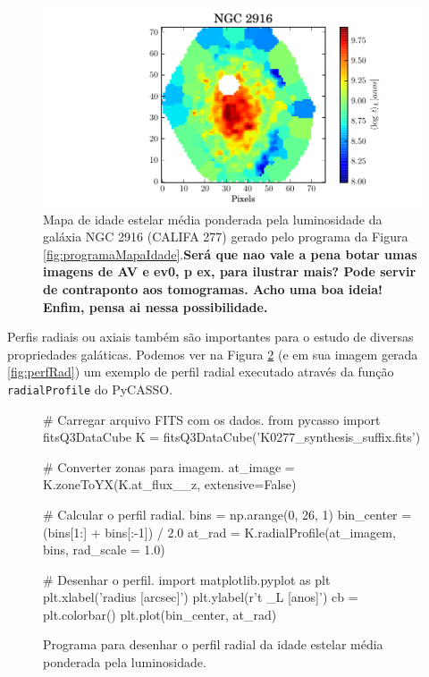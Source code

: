 \begin{figure}
	\includegraphics{figuras/at_flux_zone.pdf}
	\caption[Mapa da idade estelar média da galáxia NGC 2916] 
	{Mapa de idade estelar média ponderada pela luminosidade da galáxia NGC 2916
	(CALIFA 277) gerado pelo programa da Figura \ref{fig:programaMapaIdade}.{\bf\ojo Será que nao vale a pena botar umas
	imagens de AV e ev0, p ex, para ilustrar mais? Pode servir de contraponto aos tomogramas. Acho uma boa ideia! Enfim,
	pensa ai nessa possibilidade.} }
	\label{fig:mapaIdade}
\end{figure}

Perfis radiais ou axiais também são importantes para o estudo de diversas propriedades galáticas. Podemos ver na Figura
\ref{fig:programaPerfRad} (e em sua imagem gerada \ref{fig:perfRad}) um exemplo de perfil radial executado através da
função \texttt{radialProfile} do PyCASSO.

\begin{figure}
\begin{python}
# Carregar arquivo FITS com os dados.
from pycasso import fitsQ3DataCube
K = fitsQ3DataCube('K0277_synthesis_suffix.fits')

# Converter zonas para imagem.
at_image = K.zoneToYX(K.at_flux__z, extensive=False)

# Calcular o perfil radial.
bins = np.arange(0, 26, 1)
bin_center = (bins[1:] + bins[:-1]) / 2.0
at_rad = K.radialProfile(at_imagem, bins, rad_scale = 1.0)

# Desenhar o perfil.
import matplotlib.pyplot as plt
plt.xlabel('radius [arcsec]')
plt.ylabel(r'\langle \log t \langle_L [anos]')
cb = plt.colorbar()
plt.plot(bin_center, at_rad)

\end{python}
	\caption[Exemplo de programa para perfil radial]
	{Programa para desenhar o perfil radial da idade estelar média ponderada pela
	luminosidade.}
	\label{fig:programaPerfRad}
\end{figure}

